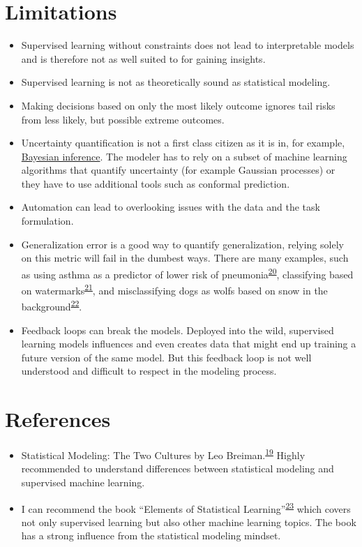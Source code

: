 \documentclass[
  10pt,
]{scrbook}
\providecommand{\tightlist}{%
  \setlength{\itemsep}{0pt}\setlength{\parskip}{0pt}}
\begin{document}
\hypertarget{limitations-6}{%
\section{Limitations}\label{limitations-6}}

\begin{itemize}
\tightlist
\item
  Supervised learning without constraints does not lead to interpretable models and is therefore not as well suited to for gaining insights.
\item
  Supervised learning is not as theoretically sound as statistical modeling.
\item
  Making decisions based on only the most likely outcome ignores tail risks from less likely, but possible extreme outcomes.
\item
  Uncertainty quantification is not a first class citizen as it is in, for example, \protect\hyperlink{bayesian}{Bayesian inference}. The modeler has to rely on a subset of machine learning algorithms that quantify uncertainty (for example Gaussian processes) or they have to use additional tools such as conformal prediction.
\item
  Automation can lead to overlooking issues with the data and the task formulation.
\item
  Generalization error is a good way to quantify generalization, relying solely on this metric will fail in the dumbest ways. There are many examples, such as using asthma as a predictor of lower risk of pneumonia\textsuperscript{\protect\hyperlink{ref-caruana2015intelligible}{20}}, classifying based on watermarks\textsuperscript{\protect\hyperlink{ref-lapuschkin2019unmasking}{21}}, and misclassifying dogs as wolfs based on snow in the background\textsuperscript{\protect\hyperlink{ref-ribeiro2016should}{22}}.
\item
  Feedback loops can break the models. Deployed into the wild, supervised learning models influences and even creates data that might end up training a future version of the same model. But this feedback loop is not well understood and difficult to respect in the modeling process.
\end{itemize}

\hypertarget{references}{%
\section{References}\label{references}}

\begin{itemize}
\tightlist
\item
  Statistical Modeling: The Two Cultures by Leo Breiman.\textsuperscript{\protect\hyperlink{ref-breiman2001statistical}{19}} Highly recommended to understand differences between statistical modeling and supervised machine learning.
\item
  I can recommend the book ``Elements of Statistical Learning''\textsuperscript{\protect\hyperlink{ref-hastie2009elements}{23}} which covers not only supervised learning but also other machine learning topics. The book has a strong influence from the statistical modeling mindset.
\end{itemize}
\end{document}
